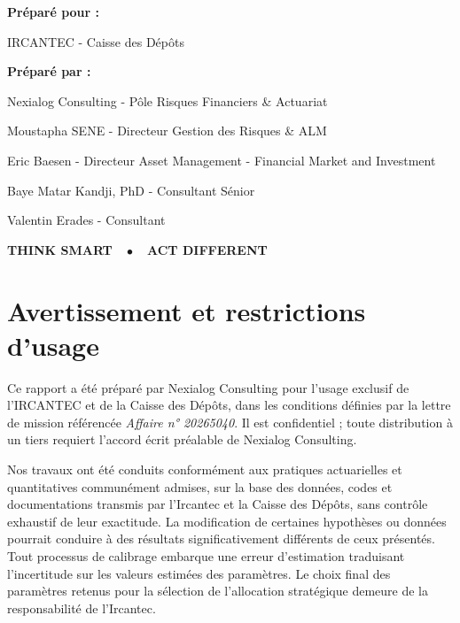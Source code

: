 \documentclass[11pt,a4paper]{article}
\newcommand{\ph}[1]{\textcolor{nxgray}{\itshape #1}}
\begin{document}
\begin{titlepage}
\begin{minipage}{\textwidth}
\vspace{5mm}
{\sffamily\bfseries\color{nxnavy}Préparé pour :}\par
IRCANTEC - Caisse des Dépôts\par

\vspace{3mm}
{\sffamily\bfseries\color{nxnavy}Préparé par :}\par
Nexialog Consulting - Pôle Risques Financiers \& Actuariat\par
Moustapha SENE - Directeur Gestion des Risques \& ALM\par
Eric Baesen - Directeur Asset Management - Financial Market and Investment\par
Baye Matar Kandji, PhD - Consultant Sénior\par
Valentin Erades - Consultant\par
\end{minipage}

\vfill

\begin{center}
{\sffamily\bfseries\large\color{nxnavy}THINK SMART~~\textcolor{nxred}{$\bullet$}~~ACT DIFFERENT}
\end{center}
\end{titlepage}

\section*{Avertissement et restrictions d'usage}

Ce rapport a été préparé par Nexialog Consulting pour l'usage exclusif de l'IRCANTEC et de la Caisse des Dépôts, dans les conditions définies par la lettre de mission référencée \ph{Affaire n° 20265040}. Il est confidentiel ; toute distribution à un tiers requiert l'accord écrit préalable de Nexialog Consulting.

\noindent Nos travaux ont été conduits conformément aux pratiques actuarielles et quantitatives communément admises, sur la base des données, codes et documentations transmis par l'Ircantec et la Caisse des Dépôts, sans contrôle exhaustif de leur exactitude. La modification de certaines hypothèses ou données pourrait conduire à des résultats significativement différents de ceux présentés. Tout processus de calibrage embarque une erreur d'estimation traduisant l'incertitude sur les valeurs estimées des paramètres. Le choix final des paramètres retenus pour la sélection de l'allocation stratégique demeure de la responsabilité de l'Ircantec.
\end{document}
